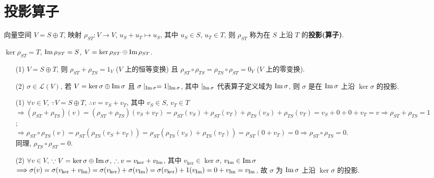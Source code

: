 \documentclass{note}
\begin{document}
\section{投影算子}
\begin{df}[投影(算子)]
    向量空间 $V=S\oplus T$, 映射 $\rho_{ST}:V\rightarrow V$, $u_S+u_T\mapsto u_S$, 其中 $u_S\in S$, $u_T\in T$, 则 $\rho_{ST}$ 称为在 $S$ 上沿 $T$ 的\textbf{投影(算子)}.
\end{df}

$\ker\rho_{ST}=T$, $\operatorname{Im}\rho_{ST}=S$, $V=\ker\rho_{ST}\oplus\operatorname{Im}\rho_{ST}$.

\begin{thm}\label{thm-2.21}
    \begin{itemize}
        \item[(1)] $V=S\oplus T$, 则 $\rho_{ST}+\rho_{TS}=1_V$ ($V$ 上的恒等变换) 且 $\rho_{ST}\circ\rho_{TS}=\rho_{TS}\circ\rho_{ST}=0_V$ ($V$ 上的零变换).
        \item[(2)] $\sigma\in\mathcal{L}(V)$, 若 $V=\ker\sigma\oplus\operatorname{Im}\sigma$ 且 $\sigma\mid_{\operatorname{Im}\sigma}=1|_{\operatorname{Im}\sigma}$, 其中 $|_{\operatorname{Im}\sigma}$ 代表算子定义域为 $\operatorname{Im}\sigma$, 则 $\sigma$ 是在 $\operatorname{Im}\sigma$ 上沿 $\ker\sigma$ 的投影.
    \end{itemize}
\end{thm}
\begin{pf}
    \begin{itemize}
        \item[(1)] $\forall v\in V$, $\because V=S\oplus T$, $\therefore v=v_S+v_T$, 其中 $v_S\in S$, $v_T\in T$\\
        $\Longrightarrow(\rho_{ST}+\rho_{TS})(v)=(\rho_{ST}+\rho_{TS})(v_S+v_T)=\rho_{ST}(v_S)+\rho_{ST}(v_T)+\rho_{TS}(v_S)+\rho_{TS}(v_T)=v_S+0+0+v_T=v\Longrightarrow\rho_{ST}+\rho_{TS}=1$;\\
        $\Longrightarrow\rho_{ST}\circ\rho_{TS}(v)=\rho_{ST}(\rho_{TS}(v_S+v_T))=\rho_{ST}(\rho_{TS}(v_S)+\rho_{TS}(v_T))=\rho_{ST}(0+v_T)=0\Longrightarrow\rho_{ST}\circ\rho_{TS}=0$.\\
        同理, $\rho_{TS}\circ\rho_{ST}=0$.
        \item[(2)] $\forall v\in V$, $\because V=\ker\sigma\oplus\operatorname{Im}\sigma$, $\therefore v=v_{\ker}+v_{\operatorname{Im}}$, 其中 $v_{\ker}\in\ker\sigma$, $v_{\operatorname{Im}}\in\operatorname{Im}\sigma$\\
        $\Longrightarrow\sigma(v)=\sigma(v_{\ker}+v_{\operatorname{Im}})=\sigma(v_{\ker})+\sigma(v_{\operatorname{Im}})=\sigma(v_{\ker})+1(v_{\operatorname{Im}})=0+v_{\operatorname{Im}}=v_{\operatorname{Im}}$, 故 $\sigma$ 为 $\operatorname{Im}\sigma$ 上沿 $\ker\sigma$ 的投影.
    \end{itemize}
\end{pf}
\end{document}
